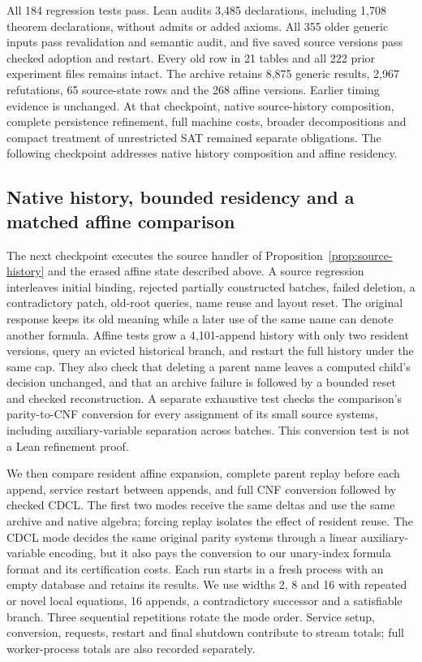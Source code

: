 \documentclass[11pt,a4paper]{article}
\numberwithin{equation}{section}
\theoremstyle{plain}
\theoremstyle{definition}
\theoremstyle{remark}
\begin{document}
All 184 regression tests pass. Lean audits 3,485 declarations, including 1,708 theorem declarations, without admits or added axioms. All 355 older generic inputs pass revalidation and semantic audit, and five saved source versions pass checked adoption and restart. Every old row in 21 tables and all 222 prior experiment files remains intact. The archive retains 8,875 generic results, 2,967 refutations, 65 source-state rows and the 268 affine versions. Earlier timing evidence is unchanged. At that checkpoint, native source-history composition, complete persistence refinement, full machine costs, broader decompositions and compact treatment of unrestricted SAT remained separate obligations. The following checkpoint addresses native history composition and affine residency.

\subsection{Native history, bounded residency and a matched affine comparison}

The next checkpoint executes the source handler of Proposition~\ref{prop:source-history} and the erased affine state described above. A source regression interleaves initial binding, rejected partially constructed batches, failed deletion, a contradictory patch, old-root queries, name reuse and layout reset. The original response keeps its old meaning while a later use of the same name can denote another formula. Affine tests grow a 4,101-append history with only two resident versions, query an evicted historical branch, and restart the full history under the same cap. They also check that deleting a parent name leaves a computed child's decision unchanged, and that an archive failure is followed by a bounded reset and checked reconstruction. A separate exhaustive test checks the comparison's parity-to-CNF conversion for every assignment of its small source systems, including auxiliary-variable separation across batches. This conversion test is not a Lean refinement proof.

We then compare resident affine expansion, complete parent replay before each append, service restart between appends, and full CNF conversion followed by checked CDCL. The first two modes receive the same deltas and use the same archive and native algebra; forcing replay isolates the effect of resident reuse. The CDCL mode decides the same original parity systems through a linear auxiliary-variable encoding, but it also pays the conversion to our unary-index formula format and its certification costs. Each run starts in a fresh process with an empty database and retains its results. We use widths 2, 8 and 16 with repeated or novel local equations, 16 appends, a contradictory successor and a satisfiable branch. Three sequential repetitions rotate the mode order. Service setup, conversion, requests, restart and final shutdown contribute to stream totals; full worker-process totals are also recorded separately.
\end{document}
